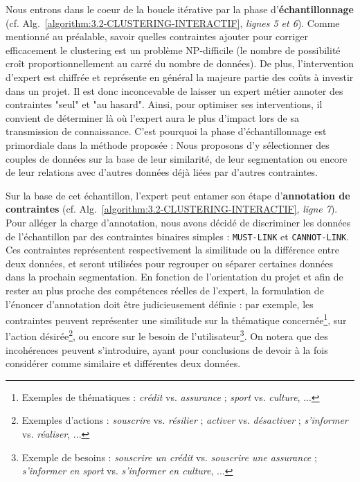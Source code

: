 		Nous entrons dans le coeur de la boucle itérative par la phase d'\textbf{échantillonnage} (cf. Alg.~\ref{algorithm:3.2-CLUSTERING-INTERACTIF}, \textit{lignes 5 et 6}).
		Comme mentionné au préalable, savoir quelles contraintes ajouter pour corriger efficacement le clustering est un problème NP-difficile (le nombre de possibilité croît proportionnellement au carré du nombre de données).
		De plus, l'intervention d'expert est chiffrée et représente en général la majeure partie des coûts à investir dans un projet.
		Il est donc inconcevable de laisser un expert métier annoter des contraintes "seul" et "au hasard".
		Ainsi, pour optimiser ses interventions, il convient de déterminer là où l'expert aura le plus d'impact lors de sa transmission de connaissance.
		C'est pourquoi la phase d'échantillonnage est primordiale dans la méthode proposée : Nous proposons d'y sélectionner des couples de données sur la base de leur similarité, de leur segmentation ou encore de leur relations avec d'autres données déjà liées par d'autres contraintes.
		
		Sur la base de cet échantillon, l'expert peut entamer son étape d'\textbf{annotation de contraintes} (cf. Alg.~\ref{algorithm:3.2-CLUSTERING-INTERACTIF}, \textit{ligne 7}).
		Pour alléger la charge d'annotation, nous avons décidé de discriminer les données de l'échantillon par des contraintes binaires simples : \texttt{MUST-LINK} et \texttt{CANNOT-LINK}. Ces contraintes représentent respectivement la similitude ou la différence entre deux données, et seront utilisées pour regrouper ou séparer certaines données dans la prochain segmentation.
		En fonction de l'orientation du projet et afin de rester au plus proche des compétences réelles de l'expert, la formulation de l'énoncer d'annotation doit être judicieusement définie : par exemple, les contraintes peuvent représenter une similitude
		sur la thématique concernée\footnote{Exemples de thématiques : \textit{crédit} vs. \textit{assurance} ; \textit{sport} vs. \textit{culture}, ...},
		sur l'action désirée\footnote{Exemples d'actions : \textit{souscrire} vs. \textit{résilier} ; \textit{activer} vs. \textit{désactiver} ; \textit{s'informer} vs. \textit{réaliser}, ...},
		ou encore sur le besoin de l'utilisateur\footnote{Exemple de besoins : \textit{souscrire un crédit} vs. \textit{souscrire une assurance} ; \textit{s'informer en sport} vs. \textit{s'informer en culture}, ...}.
		On notera que des incohérences peuvent s'introduire, ayant pour conclusions de devoir à la fois considérer comme similaire et différentes deux données.
		
